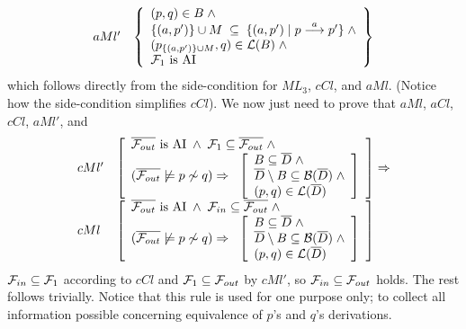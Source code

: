 \begin{theorem}[Soundness]
\begin{trivlist}
\[\begin{array}{ll}
aMl' &
\left\{
\begin{array}{l}
(p,q)\in B\;\wedge\\
\{(a,p')\}\cup M\;\subseteq\;\{(a,p')\mid p\stackrel{a}{\longrightarrow}p'\}\;\wedge\\
(p_{\{(a,p')\}\cup M},q)\in{\cal L}(B)\;\wedge\\
{\cal F}_{1} \mbox{ is AI}
\end{array}\right\}
\end{array}
\]
which follows directly from the side-condition for $ML_3$, $cCl$, and $aMl$.
(Notice how the side-condition simplifies $cCl$). We now just need to prove that $aMl$, $aCl$, $cCl$, $aMl'$, and
\[
\begin{array}{ll}
cMl' &
\left[
\begin{array}{l}
\overline{{\cal F}_{out}}  \mbox{ is AI} \;\wedge\;{\cal F}_{1}\subseteq\overline{{\cal F}_{out}}\;\wedge\\
(\overline{{\cal F}_{out}}\not\models p\not\sim q)\Rightarrow\;\;
\left[
\begin{array}{l}
B\subseteq \overline{D}\; \wedge\\
\overline{D}\setminus B\subseteq {\cal B}(\overline{D})\;\wedge\\
(p,q)\in{\cal L}(\overline{D})
\end{array}
\right]
\end{array}
\right]\Rightarrow\\

cMl &
\left[
\begin{array}{l}
\overline{{\cal F}_{out}}  \mbox{ is AI} \;\wedge\;{\cal F}_{in}\subseteq\overline{{\cal F}_{out}}\;\wedge\\
(\overline{{\cal F}_{out}}\not\models p\not\sim q)\Rightarrow\;\;
\left[
\begin{array}{l}
B\subseteq \overline{D}\; \wedge\\
\overline{D}\setminus B\subseteq {\cal B}(\overline{D})\;\wedge\\
(p,q)\in{\cal L}(\overline{D})
\end{array}
\right]
\end{array}
\right]

\end{array}
\]
${\cal F}_{in}\subseteq{\cal F}_{1}$ according to $cCl$ and ${\cal F}_{1}\subseteq{\cal F}_{out}$ by $cMl'$, so ${\cal F}_{in}\subseteq{\cal F}_{out}$ holds. The rest follows trivially. Notice that this rule is used for one purpose only; to collect all information possible concerning equivalence of $p$'s and $q$'s derivations.



\end{trivlist}
\end{theorem}
